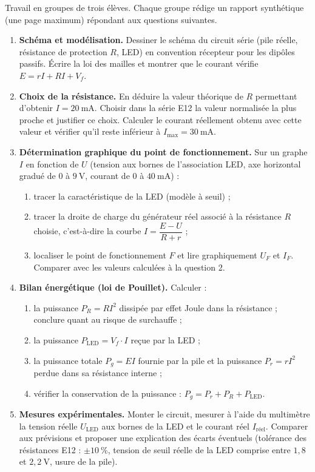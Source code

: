 \documentclass[11pt]{article}
\newcommand{\cle}[1]{{\popxbold\color{popdark}#1}}
\newcounter{popsec}
\newcounter{popsub}
\newcommand{\courssub}[1]{%
  \stepcounter{popsub}%
  \par\vspace{9pt}\noindent{\popxbold\fontsize{11.5}{13}\selectfont\color{popink}{\color{poporange}\thepopsec.\thepopsub}\hspace{6pt}#1}\par\nopagebreak\vspace{4pt}
}
\begin{document}
\courssub{Consignes}

Travail en groupes de trois élèves. Chaque groupe rédige un rapport synthétique (une page maximum) répondant aux questions suivantes.

\begin{enumerate}
\item \textbf{Schéma et modélisation.} Dessiner le schéma du circuit série (pile réelle, résistance de protection $R$, LED) en convention récepteur pour les dipôles passifs. Écrire la loi des mailles et montrer que le courant vérifie $E = rI + RI + V_f$.
\item \textbf{Choix de la résistance.} En déduire la valeur théorique de $R$ permettant d'obtenir $I = 20\ \text{mA}$. Choisir dans la série E12 la valeur normalisée la plus proche et justifier ce choix. Calculer le courant réellement obtenu avec cette valeur et vérifier qu'il reste inférieur à $I_{\max} = 30\ \text{mA}$.
\item \textbf{Détermination graphique du point de fonctionnement.} Sur un graphe $I$ en fonction de $U$ (tension aux bornes de l'association LED, axe horizontal gradué de $0$ à $9\ \text{V}$, courant de $0$ à $40\ \text{mA}$) :
\begin{enumerate}
\item tracer la caractéristique de la LED (modèle à seuil) ;
\item tracer la \cle{droite de charge} du générateur réel associé à la résistance $R$ choisie, c'est-à-dire la courbe $I = \dfrac{E - U}{R + r}$ ;
\item localiser le point de fonctionnement $F$ et lire graphiquement $U_F$ et $I_F$. Comparer avec les valeurs calculées à la question 2.
\end{enumerate}
\item \textbf{Bilan énergétique (loi de Pouillet).} Calculer :
\begin{enumerate}
\item la puissance $P_R = RI^2$ dissipée par effet Joule dans la résistance ; conclure quant au risque de surchauffe ;
\item la puissance $P_{\text{LED}} = V_f \cdot I$ reçue par la LED ;
\item la puissance totale $P_g = EI$ fournie par la pile et la puissance $P_r = rI^2$ perdue dans sa résistance interne ;
\item vérifier la conservation de la puissance : $P_g = P_r + P_R + P_{\text{LED}}$.
\end{enumerate}
\item \textbf{Mesures expérimentales.} Monter le circuit, mesurer à l'aide du multimètre la tension réelle $U_{\text{LED}}$ aux bornes de la LED et le courant réel $I_{\text{réel}}$. Comparer aux prévisions et proposer une explication des écarts éventuels (tolérance des résistances E12 : $\pm 10\ \%$, tension de seuil réelle de la LED comprise entre $1{,}8$ et $2{,}2\ \text{V}$, usure de la pile).

\end{enumerate}
\end{document}
